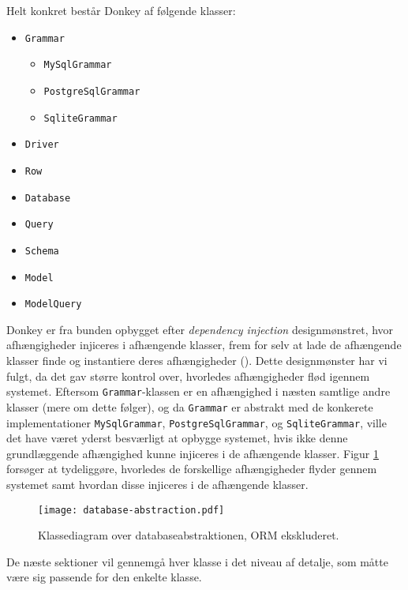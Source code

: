 Helt konkret består Donkey af følgende klasser:

\begin{multicols}{3}
\begin{itemize}
  \item \texttt{Grammar}
    \begin{itemize}
      \item \texttt{MySqlGrammar}
      \item \texttt{PostgreSqlGrammar}
      \item \texttt{SqliteGrammar}
    \end{itemize}
  \item \texttt{Driver}
  \item \texttt{Row}
  \item \texttt{Database}
  \item \texttt{Query}
  \item \texttt{Schema}
  \item \texttt{Model}
  \item \texttt{ModelQuery}
\end{itemize}
\end{multicols}

Donkey er fra bunden opbygget efter \textit{dependency injection} designmønstret, hvor afhængigheder injiceres i afhængende klasser, frem for selv at lade de afhængende klasser finde og instantiere deres afhængigheder (\cite{wiki:di}). Dette designmønster har vi fulgt, da det gav større kontrol over, hvorledes afhængigheder flød igennem systemet. Eftersom \texttt{Grammar}-klassen er en afhængighed i næsten samtlige andre klasser (mere om dette følger), og da \texttt{Grammar} er abstrakt med de konkerete implementationer \texttt{My\-Sql\-Grammar}, \texttt{Postgre\-Sql\-Grammar}, og \texttt{Sqlite\-Grammar}, ville det have været yderst besværligt at opbygge systemet, hvis ikke denne grundlæggende afhængighed kunne injiceres i de afhængende klasser. Figur \ref{class-diagram:database-abstraction} forsøger at tydeliggøre, hvorledes de forskellige afhængigheder flyder gennem systemet samt hvordan disse injiceres i de afhængende klasser.

\begin{figure}[h]
  \centering
  \texttt{[image: database-abstraction.pdf]}
  \caption{Klassediagram over databaseabstraktionen, ORM ekskluderet.}
  \label{class-diagram:database-abstraction}
\end{figure}

De næste sektioner vil gennemgå hver klasse i det niveau af detalje, som måtte være sig passende for den enkelte klasse.

